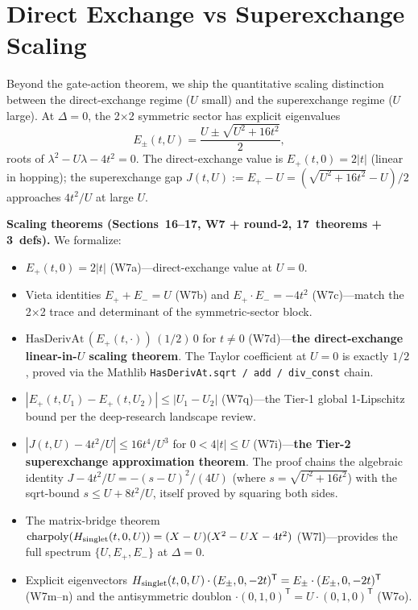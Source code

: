 \documentclass[aps,prd,twocolumn,showpacs,superscriptaddress,nofootinbib]{revtex4-2}
\begin{document}
\section{Direct Exchange vs Superexchange Scaling}
\label{sec:scaling}

Beyond the gate-action theorem, we ship the quantitative scaling
distinction between the direct-exchange regime ($U$ small) and the
superexchange regime ($U$ large). At $\Delta = 0$, the 2$\times$2
symmetric sector has explicit eigenvalues
\begin{equation}
E_\pm(t, U) = \frac{U \pm \sqrt{U^2 + 16 t^2}}{2},
\label{eq:Epm}
\end{equation}
roots of $\lambda^2 - U\lambda - 4t^2 = 0$. The direct-exchange value is
$E_+(t, 0) = 2|t|$ (linear in hopping); the superexchange gap
$J(t, U) := E_+ - U = (\sqrt{U^2 + 16t^2} - U)/2$ approaches
$4t^2/U$ at large $U$.

\textbf{Scaling theorems (Sections~16--17, W7 + round-2, 17~theorems +
3~defs).} We formalize:
\begin{itemize}
\item $E_+(t, 0) = 2|t|$ (W7a)---direct-exchange value at $U=0$.
\item Vieta identities $E_+ + E_- = U$ (W7b) and
$E_+\cdot E_- = -4t^2$ (W7c)---match the 2$\times$2 trace and
determinant of the symmetric-sector block.
\item $\text{HasDerivAt}\,(E_+(t,\cdot))\,(1/2)\,0$ for $t \ne 0$
(W7d)---\textbf{the direct-exchange linear-in-$U$ scaling theorem}.
The Taylor coefficient at $U = 0$ is exactly $1/2$, proved via the
Mathlib \texttt{HasDerivAt.sqrt / add / div\_const} chain.
\item $|E_+(t, U_1) - E_+(t, U_2)| \le |U_1 - U_2|$ (W7q)---the Tier-1
global 1-Lipschitz bound per the deep-research landscape review.
\item $|J(t, U) - 4t^2/U| \le 16t^4/U^3$ for $0 < 4|t| \le U$
(W7i)---\textbf{the Tier-2 superexchange approximation theorem}. The
proof chains the algebraic identity $J - 4t^2/U = -(s-U)^2/(4U)$
(where $s = \sqrt{U^2+16t^2}$) with the sqrt-bound
$s \le U + 8t^2/U$, itself proved by squaring both sides.
\item The matrix-bridge theorem
$\mathrm{charpoly}(H_{\rm singlet}(t, 0, U)) = (X - U)(X^2 - UX - 4t^2)$
(W7l)---provides the full spectrum $\{U, E_+, E_-\}$ at $\Delta = 0$.
\item Explicit eigenvectors
$H_{\rm singlet}(t, 0, U)\cdot (E_\pm, 0, -2t)^\mathsf{T} = E_\pm\cdot(E_\pm, 0, -2t)^\mathsf{T}$
(W7m--n) and the antisymmetric doublon
$\cdot(0, 1, 0)^\mathsf{T} = U\cdot(0, 1, 0)^\mathsf{T}$ (W7o).
\end{itemize}
\end{document}

